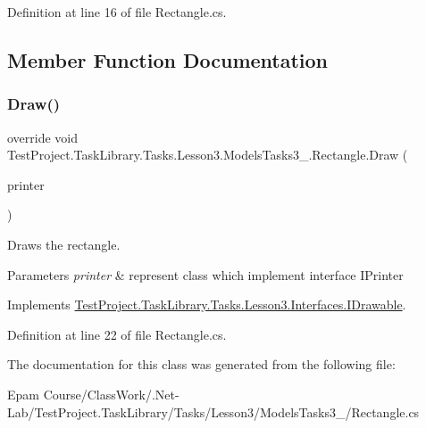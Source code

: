 Definition at line 16 of file Rectangle.\+cs.



\subsection{Member Function Documentation}
\mbox{\label{class_test_project_1_1_task_library_1_1_tasks_1_1_lesson3_1_1_models_tasks3__4_1_1_rectangle_a907edce9a5bc56a45b69cae79d9d5322}} 
\subsubsection{\texorpdfstring{Draw()}{Draw()}}
{\footnotesize\ttfamily override void Test\+Project.\+Task\+Library.\+Tasks.\+Lesson3.\+Models\+Tasks3\+\_.\+Rectangle.\+Draw (\begin{DoxyParamCaption}\item[{I\+Printer}]{printer }\end{DoxyParamCaption})}



Draws the rectangle. 


\begin{DoxyParams}{Parameters}
{\em printer} & represent class which implement interface I\+Printer\\
\hline
\end{DoxyParams}


Implements \mbox{\hyperlink{interface_test_project_1_1_task_library_1_1_tasks_1_1_lesson3_1_1_interfaces_1_1_i_drawable_a42d4b370fc36d2f695e312d7780c05d6}{Test\+Project.\+Task\+Library.\+Tasks.\+Lesson3.\+Interfaces.\+I\+Drawable}}.



Definition at line 22 of file Rectangle.\+cs.



The documentation for this class was generated from the following file\+:\begin{DoxyCompactItemize}
\item 
Epam Course/\+Class\+Work/.\+Net-\/\+Lab/\+Test\+Project.\+Task\+Library/\+Tasks/\+Lesson3/\+Models\+Tasks3\+\_/Rectangle.\+cs\end{DoxyCompactItemize}
